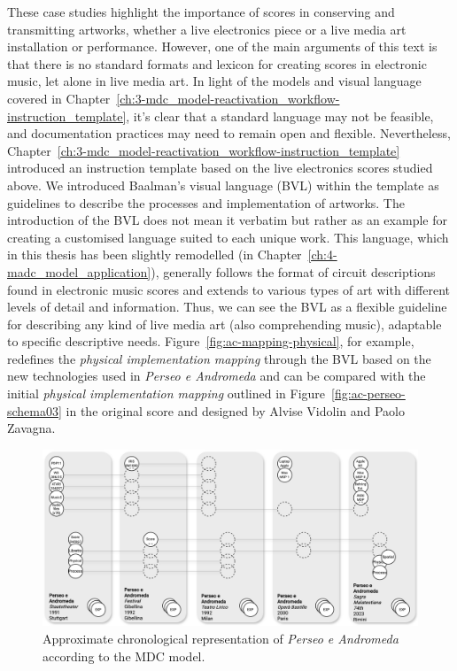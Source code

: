 These case studies highlight the importance of scores in conserving and transmitting artworks, whether a live electronics piece or a live media art installation or performance. However, one of the main arguments of this text is that there is no standard formats and lexicon for creating scores in electronic music, let alone in live media art. In light of the models and visual language covered in Chapter~\ref{ch:3-mdc_model-reactivation_workflow-instruction_template}, it’s clear that a standard language may not be feasible, and documentation practices may need to remain open and flexible. Nevertheless, Chapter~\ref{ch:3-mdc_model-reactivation_workflow-instruction_template} introduced an instruction template based on the live electronics scores studied above. We introduced Baalman’s visual language (BVL) within the template as guidelines to describe the processes and implementation of artworks. The introduction of the BVL does not mean it verbatim but rather as an example for creating a customised language suited to each unique work. This language, which in this thesis has been slightly remodelled (in Chapter~\ref{ch:4-madc_model_application}), generally follows the format of circuit descriptions found in electronic music scores and extends to various types of art with different levels of detail and information. Thus, we can see the BVL as a flexible guideline for describing any kind of live media art (also comprehending music), adaptable to specific descriptive needs. Figure~\ref{fig:ac-mapping-physical}, for example, redefines the \textit{physical implementation mapping} through the BVL based on the new technologies used in \textit{Perseo e Andromeda} and can be compared with the initial \textit{physical implementation mapping} outlined in Figure~\ref{fig:ac-perseo-schema03} in the original score and designed by Alvise Vidolin and Paolo Zavagna.\\

\begin{figure}[!h]
    \includegraphics[width=\linewidth]{chapters/appendix/c/image/graphc-mdc.png}
    \caption{Approximate chronological representation of \textit{Perseo e Andromeda} according to the MDC model.}
    \label{fig:ac-graph_mdc}
\end{figure}

